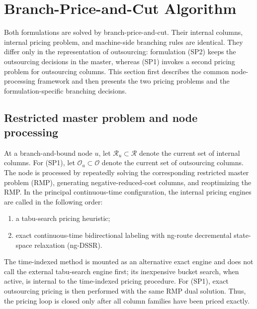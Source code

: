 \section{Branch-Price-and-Cut Algorithm}\label{sec:solution}

Both formulations are solved by branch-price-and-cut. Their internal columns,
internal pricing problem, and machine-side branching rules are identical. They
differ only in the representation of outsourcing: formulation
\textup{(SP2)} keeps the outsourcing decisions in the master, whereas
\textup{(SP1)} invokes a second pricing problem for outsourcing columns.
This section first describes the common node-processing framework and then presents
the two pricing problems and the formulation-specific branching decisions.

\subsection{Restricted master problem and node processing}

At a branch-and-bound node $u$, let $\mathcal R_u\subset\mathcal R$ denote the
current set of internal columns. For \textup{(SP1)}, let
$\mathcal O_u\subset\mathcal O$ denote the current set of outsourcing columns. The
node is processed by repeatedly solving the corresponding restricted master
problem (RMP), generating negative-reduced-cost columns, and reoptimizing the RMP.
In the principal continuous-time configuration, the internal pricing engines are
called in the following order:
\begin{enumerate}[label=(\roman*)]
    \item a tabu-search pricing heuristic;
    \item exact continuous-time bidirectional labeling with ng-route decremental
    state-space relaxation (ng-DSSR).
\end{enumerate}
The time-indexed method is mounted as an alternative exact engine and does not call
the external tabu-search engine first; its inexpensive bucket search, when active,
is internal to the time-indexed pricing procedure.
For \textup{(SP1)}, exact outsourcing pricing is then performed with the
same RMP dual solution. Thus, the pricing loop is closed only after all column
families have been priced exactly.

